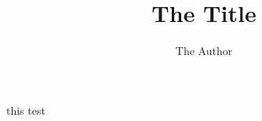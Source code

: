 \documentclass{beamer}
\title{The Title}
\author{The Author}
\institute{The Institute}
\begin{document}
\begin{frame}
  \maketitle
\end{frame}

\begin{frame}{this}
 test
\end{frame}
\end{document}
